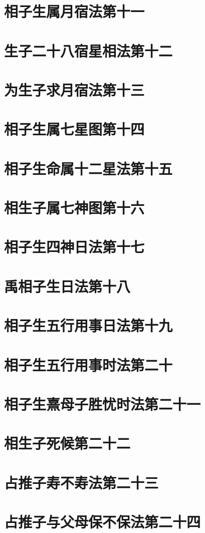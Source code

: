 \documentclass[a4paper,12pt,UTF8,twoside]{ctexbook}
\begin{document}
\chapter{相子生属月宿法第十一}
\chapter{生子二十八宿星相法第十二}
\chapter{为生子求月宿法第十三}
\chapter{相子生属七星图第十四}
\chapter{相子生命属十二星法第十五}
\chapter{相生子属七神图第十六}
\chapter{相子生四神日法第十七}
\chapter{禹相子生日法第十八}
\chapter{相子生五行用事日法第十九}
\chapter{相子生五行用事时法第二十}
\chapter{相子生熹母子胜忧时法第二十一}
\chapter{相生子死候第二十二}
\chapter{占推子寿不寿法第二十三}
\chapter{占推子与父母保不保法第二十四}
\end{document}
